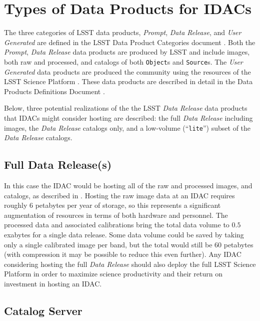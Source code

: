 \section{Types of Data Products for IDACs}\label{sec:data}

The three categories of LSST data products, {\it Prompt}, {\it Data Release}, and {\it User Generated} are defined in the LSST Data Product Categories document  .
Both the {\it Prompt}, {\it Data Release} data products are produced by LSST and include images, both raw and processed, and catalogs of both {\tt Object}s and {\tt Source}s.
The  {\it User Generated} data products are produced the community using the resources of the LSST Science Platform .
These data products are described in detail in the Data Products Definitions Document .

Below, three potential realizations of the the LSST {\it Data Release} data products that IDACs might consider hosting are described: the full {\it Data Release} including images, the {\it Data Release} catalogs only, and a low-volume (``{\tt lite}'') subset of the {\it Data Release} catalogs.

\subsection{Full Data Release(s)}

In this case the IDAC would be hosting all of the raw and processed images, and catalogs, as described in . Hosting the raw image data at an IDAC requires roughly $6$ petabytes per year of storage, so this represents a significant augmentation of resources in terms of both hardware and personnel. The processed data and associated calibrations bring the total data volume to $0.5$ exabytes for a single data release. Some data volume could be saved by taking only a single calibrated image per band, but the total would still be $60$ petabytes (with compression it may be possible to reduce this even further). Any IDAC considering hosting the full {\it Data Release} should also deploy the full LSST Science Platform  in order to maximize science productivity and their return on investment in hosting an IDAC.

\subsection{Catalog Server}

